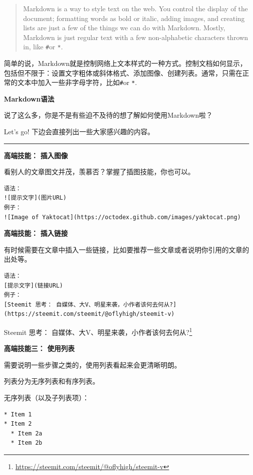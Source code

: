 \documentclass[]{ctexbook}
\renewcommand{\href}[2]{#2\footnote{\url{#1}}}
\begin{document}
\begin{quote}
Markdown is a way to style text on the web. You control the display of the document; formatting words as bold or italic, adding images, and creating lists are just a few of the things we can do with Markdown. Mostly, Markdown is just regular text with a few non-alphabetic characters thrown in, like \texttt{\#}or \texttt{*}.
\end{quote}

简单的说，Markdown就是控制网络上文本样式的一种方式。控制文档如何显示，包括但不限于：设置文字粗体或斜体格式、添加图像、创建列表。通常，只需在正常的文本中加入一些非字母字符，比如\texttt{\#}or \texttt{*}.

\textbf{Markdown语法}

说了这么多，你是不是有些迫不及待的想了解如何使用Markdown啦？

Let's go! 下边会直接列出一些大家感兴趣的内容。

\begin{center}\rule{0.5\linewidth}{\linethickness}\end{center}

\textbf{高端技能： 插入图像}

看别人的文章图文并茂，羡慕否？掌握了插图技能，你也可以。

\begin{verbatim}
语法：
![提示文字](图片URL)
例子：
![Image of Yaktocat](https://octodex.github.com/images/yaktocat.png)
\end{verbatim}

\textbf{高端技能： 插入链接}

有时候需要在文章中插入一些链接，比如要推荐一些文章或者说明你引用的文章的出处等。

\begin{verbatim}
语法：
[提示文字](链接URL)
例子：
[Steemit 思考： 自媒体、大V、明星来袭，小作者该何去何从?](https://steemit.com/steemit/@oflyhigh/steemit-v)
\end{verbatim}

\href{https://steemit.com/steemit/@oflyhigh/steemit-v}{Steemit 思考： 自媒体、大V、明星来袭，小作者该何去何从?}

\textbf{高端技能三： 使用列表}

需要说明一些步骤之类的，使用列表看起来会更清晰明朗。

列表分为无序列表和有序列表。

无序列表（以及子列表项）：

\begin{verbatim}
* Item 1
* Item 2
  * Item 2a
  * Item 2b
\end{verbatim}
\end{document}

